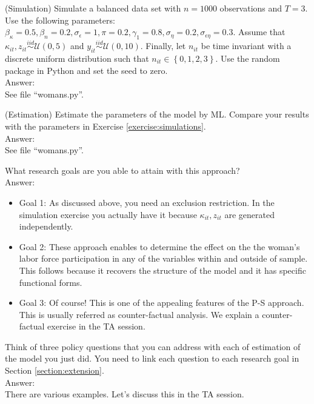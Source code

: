 \begin{exercise} (Simulation) \label{exercise:simulations}
Simulate a balanced data set with $n = 1000$ observations and $T=3$. Use the following parameters: $\beta_\kappa = 0.5, \beta_n = 0.2, \sigma_\epsilon = 1, \pi = 0.2, \gamma_1 = 0.8, \sigma_\eta = 0.2, \sigma_{\epsilon \eta} = 0.3$. Assume that $\kappa_{it},z_{it} \overset{iid}{\sim} \mathcal{U} (0,5)$ and $y_{it} \overset{iid}{\sim} \mathcal{U} (0,10)$. Finally, let $n_{it}$ be time invariant with a discrete uniform distribution such that $n_{it} \in \left\{0,1,2,3\right\}$. Use the random package in Python and set the seed to zero.\\
\noindent Answer:\\
\noindent See file ``womans.py''.
\end{exercise}

\begin{exercise} (Estimation)
Estimate the parameters of the model by ML. Compare your results with the parameters in Exercise \ref{exercise:simulations}.\\
\noindent Answer:\\
\noindent See file ``womans.py''.
\end{exercise}

\begin{exercise} \label{exercise:psapproach}
What research goals are you able to attain with this approach?\\
\noindent Answer:\\
\begin{itemize}
\item Goal 1: As discussed above, you need an exclusion restriction. In the simulation exercise you actually have it because $\kappa_{it},z_{it}$ are generated independently.
\item Goal 2: These approach enables to determine the effect on the the woman's labor force participation in any of the variables within and outside of sample. This follows because it recovers the structure of the model and it has specific functional forms. 
\item Goal 3: Of course! This is one of the appealing features of the P-S approach. This is usually referred as counter-factual analysis. We explain a counter-factual exercise in the TA session.  
\end{itemize}
 
\end{exercise}

\begin{exercise}
Think of three policy questions that you can address with each of estimation of the model you just did. You need to link each question to each research goal in Section \ref{section:extension}.\\
\noindent Answer:\\
\noindent There are various examples. Let's discuss this in the TA session.
\end{exercise}

